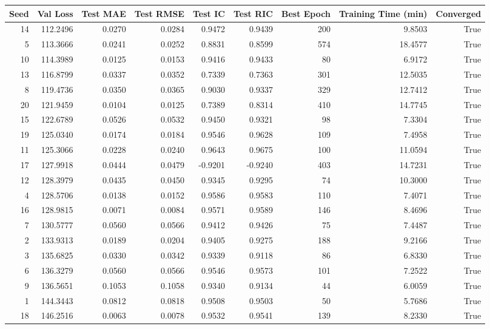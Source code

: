 \begin{tabular}{rrrrrrrrr}
\toprule
Seed & Val Loss & Test MAE & Test RMSE & Test IC & Test RIC & Best Epoch & Training Time (min) & Converged \\
\midrule
14 & 112.2496 & 0.0270 & 0.0284 & 0.9472 & 0.9439 & 200 & 9.8503 & True \\
5 & 113.3666 & 0.0241 & 0.0252 & 0.8831 & 0.8599 & 574 & 18.4577 & True \\
10 & 114.3989 & 0.0125 & 0.0153 & 0.9416 & 0.9433 & 80 & 6.9172 & True \\
13 & 116.8799 & 0.0337 & 0.0352 & 0.7339 & 0.7363 & 301 & 12.5035 & True \\
8 & 119.4736 & 0.0350 & 0.0365 & 0.9030 & 0.9337 & 329 & 12.7412 & True \\
20 & 121.9459 & 0.0104 & 0.0125 & 0.7389 & 0.8314 & 410 & 14.7745 & True \\
15 & 122.6789 & 0.0526 & 0.0532 & 0.9450 & 0.9321 & 98 & 7.3304 & True \\
19 & 125.0340 & 0.0174 & 0.0184 & 0.9546 & 0.9628 & 109 & 7.4958 & True \\
11 & 125.3066 & 0.0228 & 0.0240 & 0.9643 & 0.9675 & 100 & 11.0594 & True \\
17 & 127.9918 & 0.0444 & 0.0479 & -0.9201 & -0.9240 & 403 & 14.7231 & True \\
12 & 128.3979 & 0.0435 & 0.0450 & 0.9345 & 0.9295 & 74 & 10.3000 & True \\
4 & 128.5706 & 0.0138 & 0.0152 & 0.9586 & 0.9583 & 110 & 7.4071 & True \\
16 & 128.9815 & 0.0071 & 0.0084 & 0.9571 & 0.9589 & 146 & 8.4696 & True \\
7 & 130.5777 & 0.0560 & 0.0566 & 0.9412 & 0.9426 & 75 & 7.4487 & True \\
2 & 133.9313 & 0.0189 & 0.0204 & 0.9405 & 0.9275 & 188 & 9.2166 & True \\
3 & 135.6825 & 0.0330 & 0.0342 & 0.9339 & 0.9118 & 86 & 6.8330 & True \\
6 & 136.3279 & 0.0560 & 0.0566 & 0.9546 & 0.9573 & 101 & 7.2522 & True \\
9 & 136.5651 & 0.1053 & 0.1058 & 0.9340 & 0.9134 & 44 & 6.0059 & True \\
1 & 144.3443 & 0.0812 & 0.0818 & 0.9508 & 0.9503 & 50 & 5.7686 & True \\
18 & 146.2516 & 0.0063 & 0.0078 & 0.9532 & 0.9541 & 139 & 8.2330 & True \\
\bottomrule
\end{tabular}

